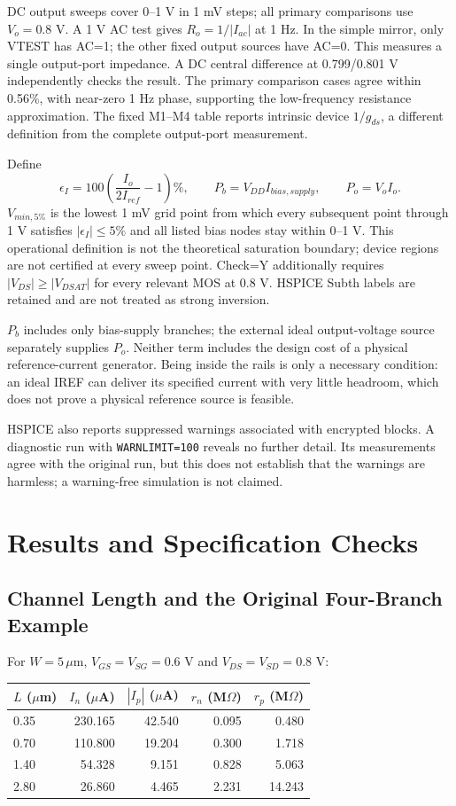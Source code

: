 DC output sweeps cover 0--1 V in 1 mV steps; all primary comparisons use $V_o=0.8$ V. A 1 V AC test gives $R_o=1/|I_{ac}|$ at 1 Hz. In the simple mirror, only VTEST has AC=1; the other fixed output sources have AC=0. This measures a single output-port impedance. A DC central difference at 0.799/0.801 V independently checks the result. The primary comparison cases agree within 0.56\%, with near-zero 1 Hz phase, supporting the low-frequency resistance approximation. The fixed M1--M4 table reports intrinsic device $1/g_{ds}$, a different definition from the complete output-port measurement.

Define
\[
\epsilon_I=100\left(\frac{I_o}{2I_{ref}}-1\right)\%,\qquad
P_b=V_{DD}I_{bias,supply},\qquad P_o=V_oI_o.
\]
$V_{min,5\%}$ is the lowest 1 mV grid point from which every subsequent point through 1 V satisfies $|\epsilon_I|\le5\%$ and all listed bias nodes stay within 0--1 V. This operational definition is not the theoretical saturation boundary; device regions are not certified at every sweep point. Check=Y additionally requires $|V_{DS}|\ge|V_{DSAT}|$ for every relevant MOS at 0.8 V. HSPICE Subth labels are retained and are not treated as strong inversion.

$P_b$ includes only bias-supply branches; the external ideal output-voltage source separately supplies $P_o$. Neither term includes the design cost of a physical reference-current generator. Being inside the rails is only a necessary condition: an ideal IREF can deliver its specified current with very little headroom, which does not prove a physical reference source is feasible.

HSPICE also reports suppressed warnings associated with encrypted blocks. A diagnostic run with \texttt{WARNLIMIT=100} reveals no further detail. Its measurements agree with the original run, but this does not establish that the warnings are harmless; a warning-free simulation is not claimed.

\section{Results and Specification Checks}
\subsection{Channel Length and the Original Four-Branch Example}
For $W=5\,\mu$m, $V_{GS}=V_{SG}=0.6$ V and $V_{DS}=V_{SD}=0.8$ V:

\begin{center}\small
\begin{tabular}{lrrrr}
\toprule
$L$ ($\mu$m) & $I_n$ ($\mu$A) & $|I_p|$ ($\mu$A) & $r_n$ (M$\Omega$) & $r_p$ (M$\Omega$) \\
\midrule
0.35 & 230.165 & 42.540 & 0.095 & 0.480 \\
0.70 & 110.800 & 19.204 & 0.300 & 1.718 \\
1.40 & 54.328 & 9.151 & 0.828 & 5.063 \\
2.80 & 26.860 & 4.465 & 2.231 & 14.243 \\
\bottomrule
\end{tabular}
\end{center}

